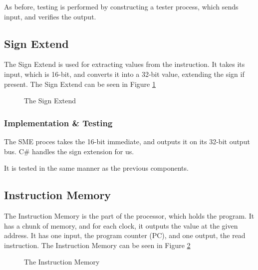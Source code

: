 As before, testing is performed by constructing a tester process, which sends
input, and verifies the output.

\subsection{Sign Extend}
The Sign Extend is used for extracting values from the instruction. It takes
its input, which is 16-bit, and converts it into a 32-bit value, extending the
sign if present. The Sign Extend can be seen in Figure \ref{fig:sign}
\begin{figure}
    \centering
    \caption{The Sign Extend}
    \label{fig:sign}
\end{figure}

\subsubsection*{Implementation \& Testing}
The SME proces takes the 16-bit immediate, and outputs it on its 32-bit output
bus. C\# handles the sign extension for us.

It is tested in the same manner as the previous components.

\subsection{Instruction Memory}
The Instruction Memory is the part of the processor, which holds the program.
It has a chunk of memory, and for each clock, it outputs the value at the given
address. It has one input, the program counter (PC), and one output, the read
instruction. The Instruction Memory can be seen in Figure \ref{fig:inst}
\begin{figure}
    \centering
    \caption{The Instruction Memory}
    \label{fig:inst}
\end{figure}

